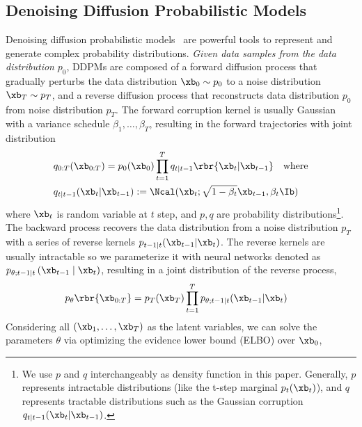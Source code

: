 \subsection{Denoising Diffusion Probabilistic Models} 
\label{sec.diffusion}
Denoising diffusion probabilistic models~\citep[DDPMs,][]{sohl-dickstein2015deep,song2019generative,ho2020denoising} are powerful tools to represent and generate complex probability distributions. \emph{Given data samples from the data distribution} $p_0$, DDPMs are composed of a forward diffusion process that gradually perturbs the data distribution $\xb_0\sim p_0$ to a noise distribution $\xb_T\sim p_T$, and a reverse diffusion process that reconstructs data distribution $p_0$ from noise distribution $p_T$.
 The forward corruption kernel is usually Gaussian with a variance schedule $\beta_1,\dots,\beta_T$, resulting in the forward trajectories with joint distribution
\begin{align}
    &q_{{0:T}}(\xb_{0:T}) = p_0(\xb_0)\prod_{t=1}^Tq_{t|t-1}\rbr{\xb_t|\xb_{t-1}} \quad \text{where}\notag\\
    &q_{t|t-1}(\xb_t|\xb_{t-1}) := \Ncal(\xb_t;\sqrt{1-\beta_t}\xb_{t-1},\beta_t\Ib)\label{eq:corruption_ddpm}
\end{align}
where $\xb_t$ is random variable at $t$ step, and $p, q$ are probability distributions\footnote{We use $p$ and $q$ interchangeably as density function in this paper. Generally, $p$ represents intractable distributions (like the t-step marginal $p_t(\xb_t)$), and $q$ represents tractable distributions such as the Gaussian corruption $q_{t\mid t-1}(\xb_t|\xb_{t-1})$.}.
The backward process recovers the data distribution from a noise distribution $p_T$ with a series of reverse kernels $p_{t-1|t}(\xb_{t-1}|\xb_t)$. 
The reverse kernels are usually intractable so we parameterize it with neural networks denoted as $p_{\theta;t-1|t}\left(\xb_{t-1} \mid \xb_t\right)$, resulting in a joint distribution of the reverse process,
$$
p_\theta\rbr{\xb_{0:T}}=p_T(\xb_T)\prod_{t=1}^Tp_{\theta;t-1|t}(\xb_{t-1}|\xb_{t})\quad
$$
Considering all $(\xb_1,\dots,\xb_T)$ as the latent variables, we can solve the parameters $\theta$ via optimizing the evidence lower bound (ELBO) over $\xb_0$,
